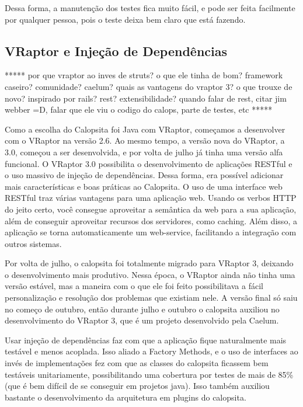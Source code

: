 Dessa forma, a manutenção dos testes fica muito fácil, e pode ser feita facilmente por qualquer pessoa, pois o teste deixa bem claro que está fazendo.


\subsection{VRaptor e Injeção de Dependências}

*****
por que vraptor ao inves de struts? o que ele tinha de bom? framework caseiro? comunidade? caelum?
quais as vantagens do vraptor 3? o que trouxe de novo? inspirado por rails? rest? extensibilidade?
quando falar de rest, citar jim webber =D, falar que ele viu o codigo do calops, parte de testes, etc
*****

Como a escolha do Calopsita foi Java com VRaptor, começamos a desenvolver com o VRaptor na versão 2.6. 
Ao mesmo tempo, a versão nova do VRaptor, a 3.0, começou a ser desenvolvida, e por volta de julho já tinha 
uma versão alfa funcional. O VRaptor 3.0 possibilita o desenvolvimento de aplicações RESTful \cite{rest}
e o uso massivo de injeção de dependências\cite{dsl}. Dessa forma, era possível adicionar mais 
características e boas práticas ao Calopsita. O uso de uma interface web RESTful traz várias vantagens para 
uma aplicação web. Usando os verbos HTTP do jeito certo, você consegue aproveitar a semântica da web para a 
sua aplicação, além de conseguir aproveitar recursos dos servidores, como caching. Além disso, a aplicação 
se torna automaticamente um web-service, facilitando a integração com outros sistemas.

Por volta de julho, o calopsita foi totalmente migrado para VRaptor 3, deixando o desenvolvimento mais produtivo. 
Nessa época, o VRaptor ainda não tinha uma versão estável, mas a maneira com o que ele foi feito possibilitava a fácil
personalização e resolução dos problemas que existiam nele. A versão final só saiu no começo de outubro, então durante 
julho e outubro o calopsita auxiliou no desenvolvimento do VRaptor 3, que é um projeto \opensource desenvolvido pela Caelum.

Usar injeção de dependências faz com que a aplicação fique naturalmente mais testável e menos acoplada. Isso aliado a
Factory Methods\cite{gof}, e o uso de interfaces ao invés de implementações \cite{interfaces-effective} fez com que as
 classes do calopsita ficassem bem testáveis unitariamente, possibilitando 
uma cobertura por testes de mais de 85\% (que é bem difícil de se conseguir em projetos java). Isso também auxiliou bastante
o desenvolvimento da arquitetura em plugins do calopsita.

